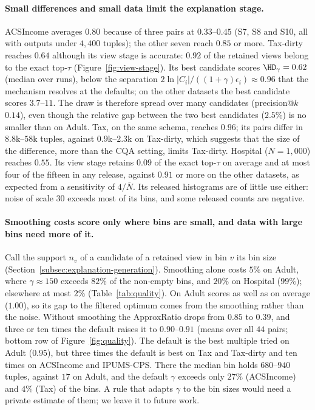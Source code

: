\paragraph{Small differences and small data limit the explanation stage.}
ACSIncome averages $0.80$  because of three pairs at $0.33$--$0.45$ (S7, S8 and S10, all with outputs under $4{,}400$ tuples); the other seven reach $0.85$ or more.
Tax-dirty reaches $0.64$ although its view stage is accurate: $0.92$ of the retained views belong to the exact top-$\tau$ (Figure~\ref{fig:view-stage}).
Its best candidate scores $\HD_\gamma=0.62$ (median over runs), below the separation $2\ln|C_i|/((1+\gamma)\epsilon_i)\approx0.96$ that the mechanism resolves at the defaults; on the other datasets the best candidate scores $3.7$--$11$.
The draw is therefore spread over many candidates (precision@$k$ $0.14$), even though the relative gap between the two best candidates ($2.5\%$) is no smaller than on Adult.
Tax, on the same schema, reaches $0.96$; its pairs differ in $8.8$k--$58$k tuples, against $0.9$k--$2.3$k on Tax-dirty, which suggests that the size of the difference, more than the CQA setting, limits Tax-dirty.
Hospital ($N=1{,}000$) reaches $0.55$.
Its view stage retains $0.09$ of the exact top-$\tau$ on average and at most four of the fifteen in any release, against $0.91$ or more on the other datasets, as expected from a sensitivity of $4/\bar N$.
Its released histograms are of little use either: noise of scale $30$ exceeds most of its bins, and some released counts are negative.

\paragraph{Smoothing costs score only where bins are small, and data with large bins need more of it.}
Call the support $n_v$ of a candidate of a retained view in bin $v$ its bin size (Section~\ref{subsec:explanation-generation}).
Smoothing alone costs \Bone{} $5\%$ on Adult, where $\gamma\approx150$ exceeds $82\%$ of the non-empty bins, and $20\%$ on Hospital ($99\%$); elsewhere at most $2\%$ (Table~\ref{tab:quality}).
On Adult \sys{} scores as well as \Bone{} on average ($1.00$), so its gap to the filtered optimum comes from the smoothing rather than the noise.
Without smoothing the ApproxRatio drops from $0.85$ to $0.39$, and three or ten times the default raises it to $0.90$--$0.91$ (means over all $44$ pairs; bottom row of Figure~\ref{fig:quality}).
The default is the best multiple tried on Adult ($0.95$), but three times the default is best on Tax and Tax-dirty and ten times on ACSIncome and IPUMS-CPS.
There the median bin holds $680$--$940$ tuples, against $17$ on Adult, and the default $\gamma$ exceeds only $27\%$ (ACSIncome) and $4\%$ (Tax) of the bins.
A rule that adapts $\gamma$ to the bin sizes would need a private estimate of them; we leave it to future work.

